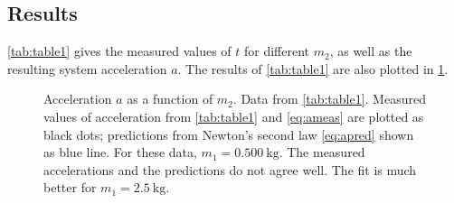 ﻿\documentclass[reprint,amsmath,amssymb,aps]{revtex4-2}
\begin{document}
%






\subsection{Results}
\cref{tab:table1} gives the measured values of $t$ for different $m_2$, as well as the resulting system acceleration $a$. The results of \cref{tab:table1} are also plotted in \cref{fig:fig1}.

\begin{figure}
\begin{center}

\end{center}
\caption{\label{fig:fig1} Acceleration $a$ as a function of $m_2$. Data from \cref{tab:table1}. Measured values of acceleration from \cref{tab:table1} and \cref{eq:ameas} are plotted as black dots; predictions from Newton's second law \cref{eq:apred} shown as blue line. For these data, $m_1=\qty{0.500}{\kilo\gram}$. The measured accelerations and the predictions do not agree well. The fit is much better for $m_1=\qty{2.5}{\kilo\gram}$.} 
\end{figure}
%
\end{document}
